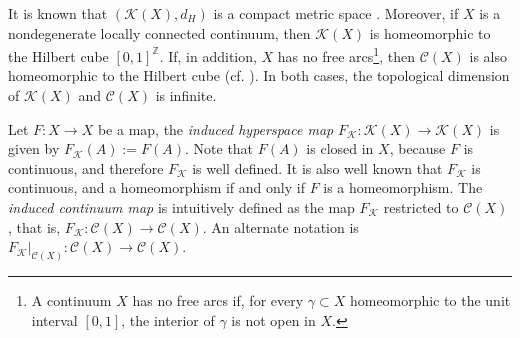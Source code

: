 \documentclass[sn-mathphys-num]{sn-jnl}%
\theoremstyle{thmstyleone}%
\theoremstyle{thmstyletwo}%
\newtheorem{remark}{Remark}%
\theoremstyle{thmstylethree}%
\newcommand*\induce[1]{#1_\mathcal{K}}
\newcommand*\hyp[1]{\mathcal{#1}}
\begin{document}
It is known that $(\hyp{K}(X),d_H)$ is a compact metric space \cite[Theorem 3.5]{illanes_nadler_1999}. Moreover, if $X$ is a nondegenerate locally connected continuum, then $\hyp{K}(X)$ is homeomorphic to the Hilbert cube $[0, 1]^{\mathbb{Z}}$. If, in addition, $X$ has no free arcs\footnote{A continuum $X$ has no free arcs if, for every $\gamma \subset X$ homeomorphic to the unit interval $[0, 1]$, the interior of $\gamma$ is not open in $X$.}, then $\hyp{C}(X)$ is also homeomorphic to the Hilbert cube (cf. \cite{curtis_schori_1974}). In both cases, the topological dimension of $\hyp{K}(X)$ and $\hyp{C}(X)$ is infinite.

Let $F: X \to X$ be a map, the \textit{induced hyperspace map} $\induce{F}: \hyp{K}(X) \to \hyp{K}(X)$ is given by $\induce{F}(A) := F(A)$. Note that $F(A)$ is closed in $X$, because $F$ is continuous, and therefore $\induce{F}$ is well defined. It is also well known that $\induce{F}$ is continuous, and a homeomorphism if and only if $F$ is a homeomorphism. The \textit{induced continuum map} is intuitively defined as the map $\induce{F}$ restricted to $\hyp{C}(X)$, that is, $\induce{F}: \hyp{C}(X) \to \hyp{C}(X)$. An alternate notation is $\induce{F}|_{\hyp{C}(X)}: \hyp{C}(X) \to \hyp{C}(X)$.\\


\end{document}
